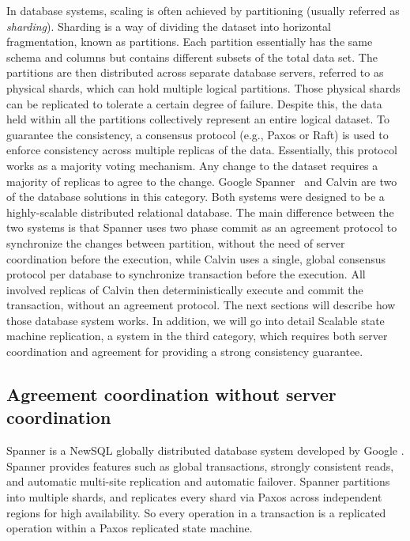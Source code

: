 In database systems, scaling is often achieved by partitioning (usually referred
as \emph{sharding}). Sharding is a way of dividing the dataset into horizontal
fragmentation, known as partitions. Each partition essentially has the same
schema and columns but contains different subsets of the total data set. The
partitions are then distributed across separate database servers, referred to as
physical shards, which can hold multiple logical partitions. Those physical
shards can be replicated to tolerate a certain degree of failure. Despite this,
the data held within all the partitions collectively represent an entire logical
dataset. To guarantee the consistency, a consensus protocol (e.g., Paxos or
Raft) is used to enforce consistency across multiple replicas of the data.
Essentially, this protocol works as a majority voting mechanism. Any change to
the dataset requires a majority of replicas to agree to the change. Google
Spanner~\cite{corbett2013spanner} and Calvin \cite{calvin} are two of the
database solutions in this category. Both systems were designed to be a
highly-scalable distributed relational database. The main difference between the
two systems is that Spanner uses two phase commit as an agreement protocol to
synchronize the changes between partition, without the need of server
coordination before the execution, while Calvin uses a single, global consensus
protocol per database to synchronize transaction before the execution. All
involved replicas of Calvin then deterministically execute and commit the
transaction, without an agreement protocol. The next sections will describe how
those database system works. In addition, we will go into detail Scalable state
machine replication, a system in the third category, which requires both server
coordination and agreement for providing a strong consistency guarantee.


\subsection{Agreement coordination without server coordination}

Spanner is a NewSQL \cite{Grolinger:2013tp} globally distributed database system
developed by Google \cite{corbett2013spanner}. Spanner provides features such as
global transactions, strongly consistent reads, and automatic multi-site
replication and automatic failover. Spanner partitions into multiple shards, and
replicates every shard via Paxos across independent regions for high
availability. So every operation in a transaction is a replicated operation
within a Paxos replicated state machine.

